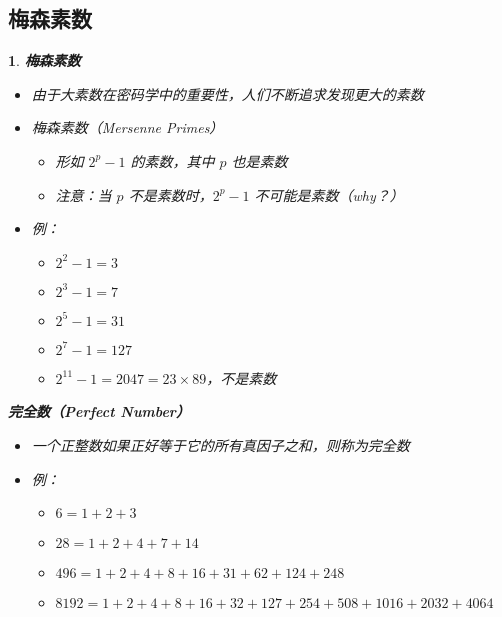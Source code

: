 \documentclass[UTF8]{report}
\theoremstyle{MyLineTheoremStyle} %
\theoremstyle{MyBlockTheoremStyle} %
\theoremstyle{MySubsubsectionStyle} %
\newtheorem{definition}{}
\begin{document}
\subsection{梅森素数}

\begin{definition}
    \textbf{梅森素数}
    \begin{itemize}
        \item 由于大素数在密码学中的重要性，人们不断追求发现更大的素数
        \item 梅森素数（Mersenne Primes）
        \begin{itemize}
            \item 形如 $2^p - 1$ 的素数，其中 $p$ 也是素数
            \item 注意：当 $p$ 不是素数时，$2^p - 1$ 不可能是素数（why？）
        \end{itemize}
        \item 例：
        \begin{itemize}
            \item $2^2 - 1 = 3$
            \item $2^3 - 1 = 7$
            \item $2^5 - 1 = 31$
            \item $2^7 - 1 = 127$
            \item $2^{11} - 1 = 2047 = 23 \times 89$，不是素数
        \end{itemize}
    \end{itemize}

    \textbf{完全数（Perfect Number）}
    \begin{itemize}
        \item 一个正整数如果正好等于它的所有真因子之和，则称为完全数
        \item 例：
        \begin{itemize}
            \item $6 = 1 + 2 + 3$
            \item $28 = 1 + 2 + 4 + 7 + 14$
            \item $496 = 1 + 2 + 4 + 8 + 16 + 31 + 62 + 124 + 248$
            \item $8192 = 1 + 2 + 4 + 8 + 16 + 32 + 127 + 254 + 508 + 1016 + 2032 + 4064$
        \end{itemize}
    \end{itemize}


\end{definition}
\end{document}
